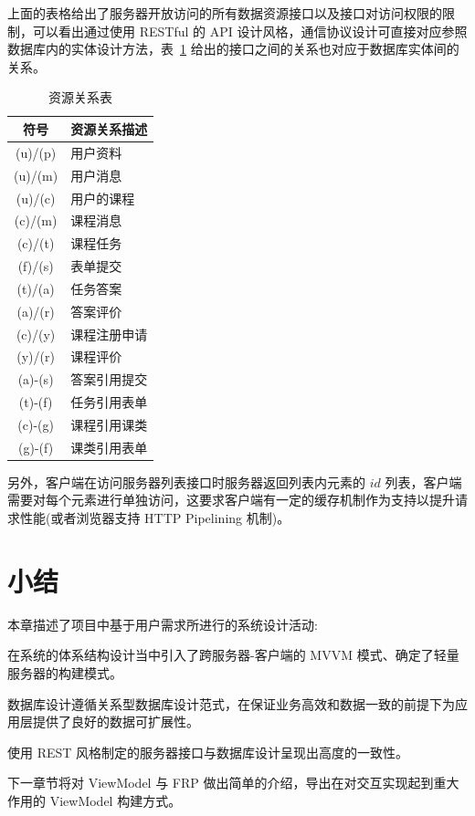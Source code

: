 
上面的表格给出了服务器开放访问的所有数据资源接口以及接口对访问权限的限制，可以看出通过使用 RESTful 的 API 设计风格，通信协议设计可直接对应参照数据库内的实体设计方法，表~\ref{APURIRelation} 给出的接口之间的关系也对应于数据库实体间的关系。

\begin{table}[!h]
  \begin{center}
    \noindent
    \ttfamily
    \begin{tabular}{|c|l|}
      \hline
      \textbf{符号} & \textbf{资源关系描述} \\ \hline
      (u)/(p) & 用户资料     \\ \hline
      (u)/(m) & 用户消息     \\ \hline
      (u)/(c) & 用户的课程   \\ \hline
      (c)/(m) & 课程消息     \\ \hline
      (c)/(t) & 课程任务     \\ \hline
      (f)/(s) & 表单提交     \\ \hline
      (t)/(a) & 任务答案     \\ \hline
      (a)/(r) & 答案评价     \\ \hline
      (c)/(y) & 课程注册申请 \\ \hline
      (y)/(r) & 课程评价     \\ \hline
      (a)-(s) & 答案引用提交 \\ \hline
      (t)-(f) & 任务引用表单 \\ \hline
      (c)-(g) & 课程引用课类 \\ \hline
      (g)-(f) & 课类引用表单 \\ \hline
    \end{tabular}
    \caption{资源关系表\label{APURIRelation}}
  \end{center}
\end{table}

另外，客户端在访问服务器列表接口时服务器返回列表内元素的 $id$ 列表，客户端需要对每个元素进行单独访问，这要求客户端有一定的缓存机制作为支持以提升请求性能(或者浏览器支持 HTTP Pipelining 机制)。

\newpage

\section{小结}

本章描述了项目中基于用户需求所进行的系统设计活动:

在系统的体系结构设计当中引入了跨服务器-客户端的 MVVM 模式、确定了轻量服务器的构建模式。

数据库设计遵循关系型数据库设计范式，在保证业务高效和数据一致的前提下为应用层提供了良好的数据可扩展性。

使用 REST 风格制定的服务器接口与数据库设计呈现出高度的一致性。

下一章节将对 ViewModel 与 FRP 做出简单的介绍，导出在对交互实现起到重大作用的 ViewModel 构建方式。

